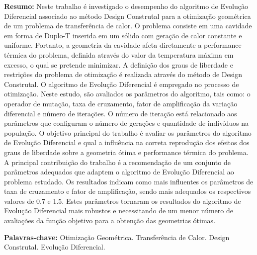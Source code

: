 \documentclass[12pt,A4,A4pt]{article}
\begin{document}
\begin{flushleft}
{\small {} \justify
\textbf{Resumo:} Neste trabalho é investigado o desempenho do algoritmo de Evolução Diferencial  associado ao método Design Construtal para a otimização geométrica de um problema de transferência de calor. O problema consiste em uma cavidade em forma de Duplo-T inserida em um sólido com geração de calor constante e uniforme. Portanto, a geometria da cavidade afeta diretamente a performance térmica do problema, definida através do valor da temperatura máxima em excesso, o qual se pretende minimizar. A definição dos graus de liberdade e restrições do problema de otimização é realizada através do método de Design Construtal. O algoritmo de Evolução Diferencial é empregado no processo de otimização. Neste estudo, são avaliados os parâmetros do algoritmo, tais como: o operador de mutação, taxa de cruzamento, fator de amplificação da variação diferencial e número de iterações. O número de iteração está relacionado aos parâmetros que configuram o número de gerações e quantidade de indivíduos na população.  O objetivo principal do trabalho é avaliar os parâmetros do algoritmo de Evolução Diferencial e qual a influência na correta reprodução dos efeitos dos graus de liberdade sobre a geometria ótima e performance térmica do problema. A principal contribuição do trabalho é a recomendação de um conjunto de parâmetros adequados que adaptem o algoritmo de Evolução Diferencial ao problema estudado. Os resultados indicam como mais influentes os parâmetros de taxa de cruzamento e fator de amplificação, sendo mais adequados os  respectivos valores de 0.7 e 1.5. Estes parâmetros tornaram os resultados do algoritmo de Evolução Diferencial mais robustos e necessitando de um menor número de avaliações da função objetivo para a obtenção das geometrias ótimas.

\vspace{0.3cm}

\noindent\textbf{Palavras-chave:} Otimização Geométrica. Transferência de Calor. Design Construtal. Evolução Diferencial.}
\end{flushleft}


\end{document}
